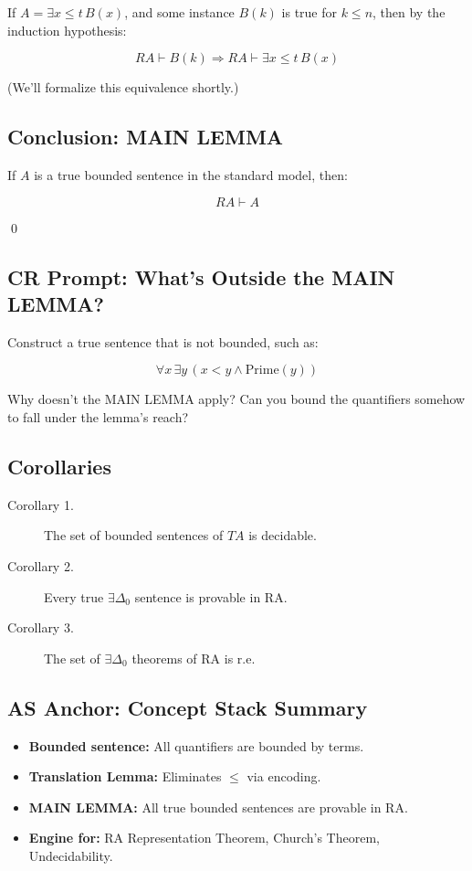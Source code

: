 \documentclass[12pt]{article}
\begin{document}
If \( A = \exists x \leq t\, B(x) \), and some instance \( B(k) \) is true for \( k \leq n \), then by the induction hypothesis:

\[
RA \vdash B(k)
\Rightarrow RA \vdash \exists x \leq t\, B(x)
\]

(We’ll formalize this equivalence shortly.)

\subsection*{Conclusion: MAIN LEMMA}

If \( A \) is a true bounded sentence in the standard model, then:

\[
RA \vdash A
\]

\qed

\subsection*{CR Prompt: What's Outside the MAIN LEMMA?}

Construct a true sentence that is not bounded, such as:

\[
\forall x\, \exists y\, (x < y \wedge \text{Prime}(y))
\]

Why doesn’t the MAIN LEMMA apply? Can you bound the quantifiers somehow to fall under the lemma’s reach?

\subsection{Corollaries}

\begin{description}
  \item[Corollary 1.] The set of bounded sentences of \( TA \) is decidable.
  \item[Corollary 2.] Every true \( \exists \Delta_0 \) sentence is provable in RA.
  \item[Corollary 3.] The set of \( \exists \Delta_0 \) theorems of RA is r.e.
\end{description}

\subsection*{AS Anchor: Concept Stack Summary}

\begin{itemize}
  \item \textbf{Bounded sentence:} All quantifiers are bounded by terms.
  \item \textbf{Translation Lemma:} Eliminates \( \leq \) via encoding.
  \item \textbf{MAIN LEMMA:} All true bounded sentences are provable in RA.
  \item \textbf{Engine for:} RA Representation Theorem, Church's Theorem, Undecidability.
\end{itemize}
\end{document}
